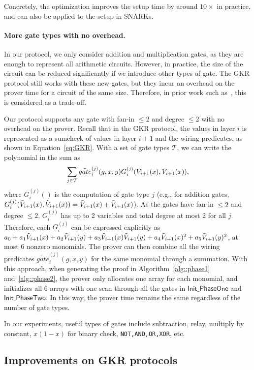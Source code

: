 Concretely, the optimization improves the setup time by around $10\times$ in practice, and can also be applied to the setup in SNARKs.

\paragraph{More gate types with no overhead.} In our protocol, we only consider addition and multiplication gates, as they are enough to represent all arithmetic circuits. However, in practice, the size of the circuit can be reduced significantly if we introduce other types of gate. The GKR protocol still works with these new gates, but they incur an overhead on the prover time for a circuit of the same size. Therefore, in prior work such as~\cite{wahby2016verifiable,vram}, this is considered as a trade-off.

Our protocol supports any gate with fan-in $\le 2$ and degree $\le 2$ with no overhead on the prover. Recall that in the GKR protocol, the values in layer $i$ is represented as a sumcheck of values in layer $i+1$ and the wiring predicates, as shown in Equation~\ref{eq:GKR}. With a set of gate types $\mathcal{T}$, we can write the polynomial in the sum as $$\sum_{j\in\mathcal{T}}\tilde{gate}^{(j)}_i(g,x,y) G^{(j)}_i(\tilde{V}_{i+1}(x),\tilde{V}_{i+1}(x)),$$ where $G^{(j)}_i()$ is the computation of gate type $j$ (e.g., for addition gates, \\$G^{(j)}_i(\tilde{V}_{i+1}(x),\tilde{V}_{i+1}(x)) = \tilde{V}_{i+1}(x)+\tilde{V}_{i+1}(x)$). As the gates have fan-in $\le 2$ and degree $\le 2$, $G^{(j)}_i$ has up to 2 variables and total degree at most 2 for all $j$. Therefore, each $G^{(j)}_i$ can be expressed explicitly as $a_0+a_1\tilde{V}_{i+1}(x)+a_2\tilde{V}_{i+1}(y)+a_3\tilde{V}_{i+1}(x)\tilde{V}_{i+1}(y)+a_4\tilde{V}_{i+1}(x)^2+a_5\tilde{V}_{i+1}(y)^2$, at most 6 nonzero monomials. The prover can then combine all the wiring predicates $\tilde{gate}^{(j)}_i(g,x,y)$ for the same monomial through a summation. With this approach, when generating the proof in Algorithm~\ref{alg::phase1} and~\ref{alg::phase2}, the prover only allocates one array for each monomial, and initializes all 6 arrays with one scan through all the gates in $\mathsf{Init\_PhaseOne}$ and $\mathsf{Init\_PhaseTwo}$. In this way, the prover time remains the same regardless of the number of gate types. 

In our experiments, useful types of gates include subtraction, relay, multiply by constant, $x(1-x)$ for binary check, \texttt{NOT,AND,OR,XOR}, etc. 


\subsection{Improvements on GKR protocols}\label{subsec:expGKR}

